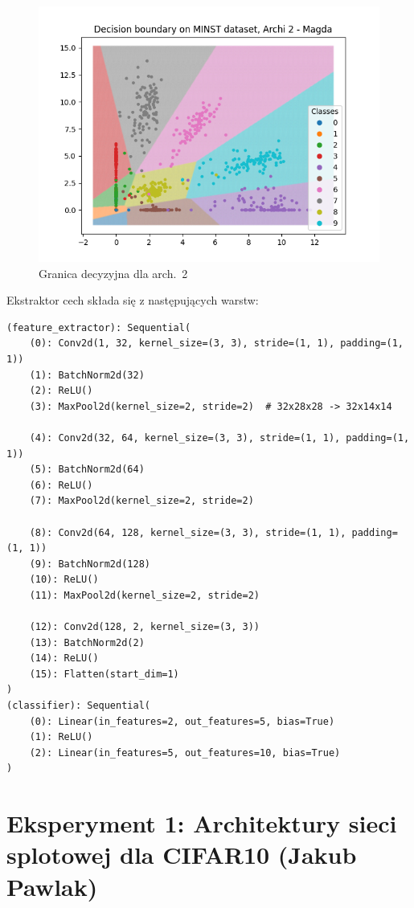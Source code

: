 \documentclass[10pt]{article}
\begin{document}
\begin{figure}
    \includegraphics[width=\linewidth]{img/magda/MNIST_small_decision}
    \caption{Granica decyzyjna dla arch.~2}\label{fig:img/magda/MNIST_small_decision}
\end{figure}

Ekstraktor cech składa się z następujących warstw:

\tiny
\begin{verbatim}
(feature_extractor): Sequential(
    (0): Conv2d(1, 32, kernel_size=(3, 3), stride=(1, 1), padding=(1, 1))
    (1): BatchNorm2d(32)
    (2): ReLU()
    (3): MaxPool2d(kernel_size=2, stride=2)  # 32x28x28 -> 32x14x14

    (4): Conv2d(32, 64, kernel_size=(3, 3), stride=(1, 1), padding=(1, 1))
    (5): BatchNorm2d(64)
    (6): ReLU()
    (7): MaxPool2d(kernel_size=2, stride=2)

    (8): Conv2d(64, 128, kernel_size=(3, 3), stride=(1, 1), padding=(1, 1))
    (9): BatchNorm2d(128)
    (10): ReLU()
    (11): MaxPool2d(kernel_size=2, stride=2)

    (12): Conv2d(128, 2, kernel_size=(3, 3))
    (13): BatchNorm2d(2)
    (14): ReLU()
    (15): Flatten(start_dim=1)
)
(classifier): Sequential(
    (0): Linear(in_features=2, out_features=5, bias=True)
    (1): ReLU()
    (2): Linear(in_features=5, out_features=10, bias=True)
)
\end{verbatim}
\normalsize




\pagebreak
\section{Eksperyment 1: Architektury sieci splotowej dla CIFAR10 (Jakub Pawlak)}\label{sec:ex1-pawlak_cifar}
\end{document}
